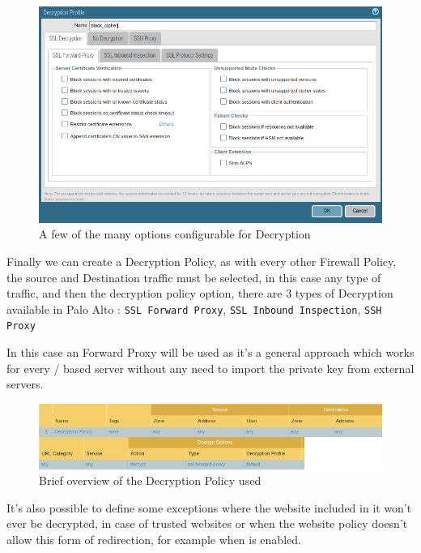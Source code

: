 \begin{figure}[!hb]
    \centering
     \includegraphics[width=13.2cm]{img/decryption_options.png}
    	\caption{A few of the many options configurable for Decryption}\label{Decryption Options}
\end{figure}

\newpage

Finally we can create a Decryption Policy, as with every other Firewall Policy, the source and Destination traffic must be selected, in this case any type of traffic, and then the decryption policy option, there are 3 types of Decryption available in Palo Alto : \verb|SSL Forward Proxy|, \verb|SSL Inbound Inspection|, \verb|SSH Proxy|

In this case an  Forward Proxy will be used as it's a general approach which works for every / based server without any need to import the private key from external servers.

\begin{figure}[!hb]
\centering
 \includegraphics[width=13cm]{img/decryption_policy.png}
	\caption{Brief overview of the Decryption Policy used}\label{Decryption Policy}
\end{figure}

It's also possible to define some exceptions where the website included in it won't ever be decrypted, in case of trusted websites or when the website policy doesn't allow this form of redirection, for example when \cite{hsts} is enabled.


